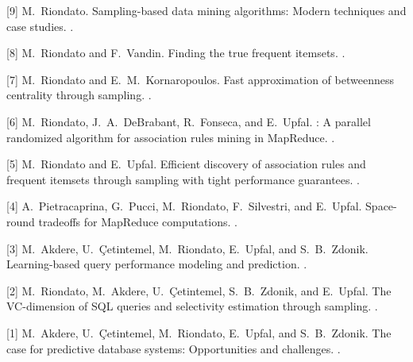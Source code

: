\documentclass[margin,line]{resume}
\begin{document}
[9] M.~Riondato.
\newblock Sampling-based data mining algorithms: Modern techniques and case
  studies.
.

[8] M.~Riondato and F.~Vandin.
\newblock Finding the true frequent itemsets.
.

[7] M.~Riondato and E.~M.~Kornaropoulos.
\newblock Fast approximation of betweenness centrality through sampling.
.

[6] M.~Riondato, J.~A.~DeBrabant, R.~Fonseca, and E.~Upfal.
: A parallel randomized algorithm for association rules mining
  in {MapReduce}.
.

[5] M.~Riondato and E.~Upfal.
\newblock Efficient discovery of association rules and frequent itemsets
  through sampling with tight performance guarantees.
.

[4] A.~Pietracaprina, G.~Pucci, M.~Riondato, F.~Silvestri, and E.~Upfal.
\newblock Space-round tradeoffs for {MapReduce} computations.
.

[3] M.~Akdere, U.~\c{C}etintemel, M.~Riondato, E.~Upfal, and S.~B.~Zdonik.
\newblock Learning-based query performance modeling and prediction.
.

[2] M.~Riondato, M.~Akdere, U.~\c{C}etintemel, S.~B.~Zdonik, and E.~Upfal.
\newblock The {VC}-dimension of {SQL} queries and selectivity estimation
  through sampling.
.

[1] M.~Akdere, U.~\c{C}etintemel, M.~Riondato, E.~Upfal, and S.~B.~Zdonik.
\newblock The case for predictive database systems: Opportunities and
  challenges.
.
\end{document}
